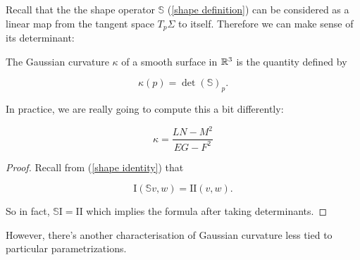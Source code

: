 \documentclass[11pt]{scrartcl}
\begin{document}
\begin{definition}

Recall that the the shape operator $\mathbb{S}$ (\ref{shape definition}) can be considered as a linear map from the tangent space $T_p \Sigma$ to itself. Therefore we can make sense of its determinant:  %

The Gaussian curvature $\kappa$ of a smooth surface in $\mathbb R^3$ is the quantity defined by 

\begin{equation}
    \kappa(p) = \det (\mathbb{S})_p.
\end{equation}
\end{definition}

In practice, we are really going to compute this a bit differently:

\begin{proposition}

\begin{equation}
    \kappa = \frac{LN - M^2}{EG - F^2}
\end{equation}

\begin{proof}
    Recall from (\ref{shape identity}) that 

    \begin{equation}
        \text{I}(\mathbb{S}v,w) = \text{II}(v,w).
    \end{equation}

    So in fact, $\mathbb{S} \text{I} = \text{II}$ which implies the formula after taking determinants.
\end{proof}
\label{det formula}
\end{proposition}

However, there's another characterisation of Gaussian curvature less tied to particular parametrizations.
\end{document}
